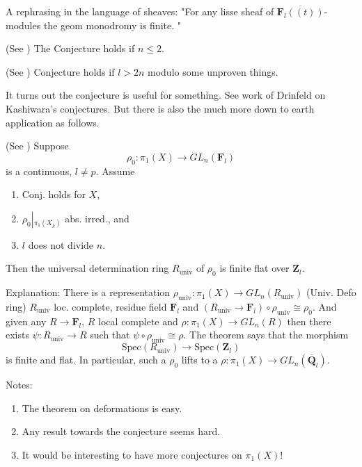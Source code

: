 \medskip\noindent
A rephrasing in the language of sheaves:
"For any lisse sheaf of $\overline{\mathbf{F}_l((t))}$-modules the geom
monodromy is finite. "

\begin{theorem}
\label{theorem-conjecture-n-2}
(See \cite{dJ-conjecture}) The Conjecture holds if $n\leq 2$.
\end{theorem}

\begin{theorem}
\label{theorem-conjecture-l-bigger-2n}
(See \cite{Gaitsgory})
Conjecture holds if $l>2n$ modulo some unproven things.
\end{theorem}

\noindent
It turns out the conjecture is useful for something.
See work of Drinfeld on Kashiwara's conjectures. But there is also
the much more down to earth application as follows.

\begin{theorem}
\label{theorem-deformation-rings}
(See \cite[Theorem 3.5]{dJ-conjecture})
Suppose
$$
\rho_0: \pi_1(X)\to GL_n(\mathbf{F}_l)
$$
is a continuous, $l\neq p$. Assume
\begin{enumerate}
\item Conj. holds for $X$,
\item $\rho_0\left|_{\pi_1(X_{\overline k})}\right.$ abs. irred., and
\item $l$ does not divide $n$.
\end{enumerate}
Then the universal determination ring $R_{\text{univ}}$ of $\rho_0$ is
finite flat over $\mathbf{Z}_l$.
\end{theorem}

\noindent
Explanation: There is a representation $\rho_{\text{univ}}:
\pi_1(X)\to GL_n(R_{\text{univ}})$ (Univ. Defo ring) $R_{\text{univ}}$ loc.
complete, residue field $\mathbf{F}_l$ and $(R_{\text{univ}}\to
\mathbf{F}_l)\circ\rho_{\text{univ}}\cong\rho_0$.
And given any $R\to \mathbf{F}_l$, $R$ local complete and $\rho: \pi_1(X)\to
GL_n(R)$ then there exists $\psi: R_{\text{univ}}\to R$ such that
$\psi\circ\rho_{\text{univ}}\cong \rho$. The theorem says that the morphism
$$
\text{Spec}(R_{\text{univ}})
\longrightarrow
\text{Spec}(\mathbf{Z}_l)
$$
is finite and flat. In particular, such a $\rho_0$
lifts to a $\rho: \pi_1(X)\to GL_n(\overline{\mathbf{Q}}_l)$.

\medskip\noindent
Notes:
\begin{enumerate}
\item The theorem on deformations is easy.
\item Any result towards the conjecture seems hard.
\item It would be interesting to have more conjectures on $\pi_1(X)$!
\end{enumerate}




